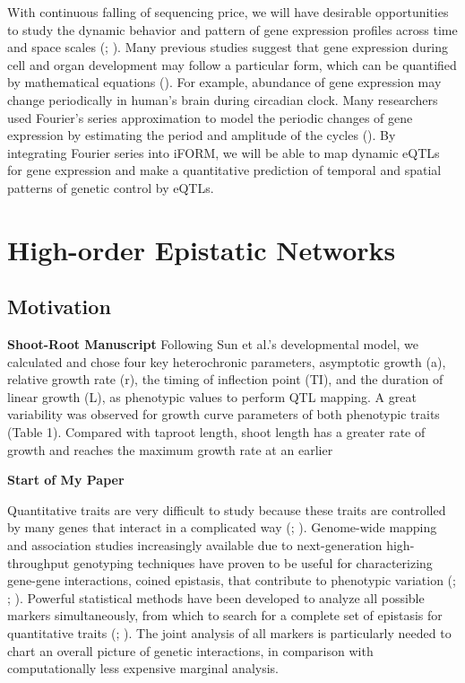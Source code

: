 \documentclass[]{book}
\theoremstyle{definition}
\theoremstyle{definition}
\theoremstyle{remark}
\begin{document}
With continuous falling of sequencing price, we will have desirable
opportunities to study the dynamic behavior and pattern of gene
expression profiles across time and space scales
(\cite{vinuela2010genome}; \cite{ackermann2013impact}). Many previous
studies suggest that gene expression during cell and organ development
may follow a particular form, which can be quantified by mathematical
equations (\cite{kim2010wavelet}). For example, abundance of gene
expression may change periodically in human's brain during circadian
clock. Many researchers used Fourier's series approximation to model the
periodic changes of gene expression by estimating the period and
amplitude of the cycles (\cite{li2013using}). By integrating Fourier
series into iFORM, we will be able to map dynamic eQTLs for gene
expression and make a quantitative prediction of temporal and spatial
patterns of genetic control by eQTLs.

\chapter{High-order Epistatic
Networks}\label{high-order-epistatic-networks}

\section{Motivation}\label{motivation-1}

\textbf{Shoot-Root Manuscript} Following Sun et al.'s
\cite{sun2014model} developmental model, we calculated and chose four
key heterochronic parameters, asymptotic growth (a), relative growth
rate (r), the timing of inflection point (TI), and the duration of
linear growth (L), as phenotypic values to perform QTL mapping. A great
variability was observed for growth curve parameters of both phenotypic
traits (Table 1). Compared with taproot length, shoot length has a
greater rate of growth and reaches the maximum growth rate at an earlier

\textbf{Start of My Paper}

Quantitative traits are very difficult to study because these traits are
controlled by many genes that interact in a complicated way
(\cite{nelson2013century}; \cite{mackay2014epistasis}). Genome-wide
mapping and association studies increasingly available due to
next-generation high-throughput genotyping techniques have proven to be
useful for characterizing gene-gene interactions, coined epistasis, that
contribute to phenotypic variation (\cite{cordell2009detecting};
\cite{van2011travelling}; \cite{wei2014detecting}). Powerful statistical
methods have been developed to analyze all possible markers
simultaneously, from which to search for a complete set of epistasis for
quantitative traits (\cite{li2014fast}; \cite{gosik2016iform}). The
joint analysis of all markers is particularly needed to chart an overall
picture of genetic interactions, in comparison with computationally less
expensive marginal analysis.
\end{document}
